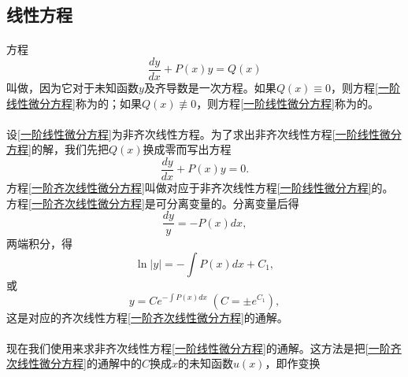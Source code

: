 \subsection{线性方程}
\paragraph{}
方程
\begin{equation}
  \label{一阶线性微分方程}
  \frac{dy}{dx} + P(x)y = Q(x)
\end{equation}
叫做，因为它对于未知函数$y$及齐导数是一次方程。如果$Q(x) \equiv 0$，则方程\eqref{一阶线性微分方程}称为的；如果$Q(x) \not\equiv 0$，则方程\eqref{一阶线性微分方程}称为的。

\paragraph{}
设\eqref{一阶线性微分方程}为非齐次线性方程。为了求出非齐次线性方程\eqref{一阶线性微分方程}的解，我们先把$Q(x)$换成零而写出方程
\begin{equation}
  \label{一阶齐次线性微分方程}
  \frac{dy}{dx} + P(x)y = 0.
\end{equation}
方程\eqref{一阶齐次线性微分方程}叫做对应于非齐次线性方程\eqref{一阶线性微分方程}的。方程\eqref{一阶齐次线性微分方程}是可分离变量的。分离变量后得
\begin{equation*}
  \frac{dy}{y} = -P(x)dx,
\end{equation*}
两端积分，得
\begin{equation*}
  \ln|y|=-\int P(x)dx+C_1,
\end{equation*}
或
\begin{equation*}
  y = Ce^{-\int P(x)dx} \; (C=\pm e^{C_1}),
\end{equation*}
这是对应的齐次线性方程\eqref{一阶齐次线性微分方程}的通解。

\paragraph{}
现在我们使用\href{https://www.cnblogs.com/lookof/archive/2009/01/06/1370065.html}{\color{blue}}来求非齐次线性方程\eqref{一阶线性微分方程}的通解。这方法是把\eqref{一阶齐次线性微分方程}的通解中的$C$换成$x$的未知函数$u(x)$，即作变换

